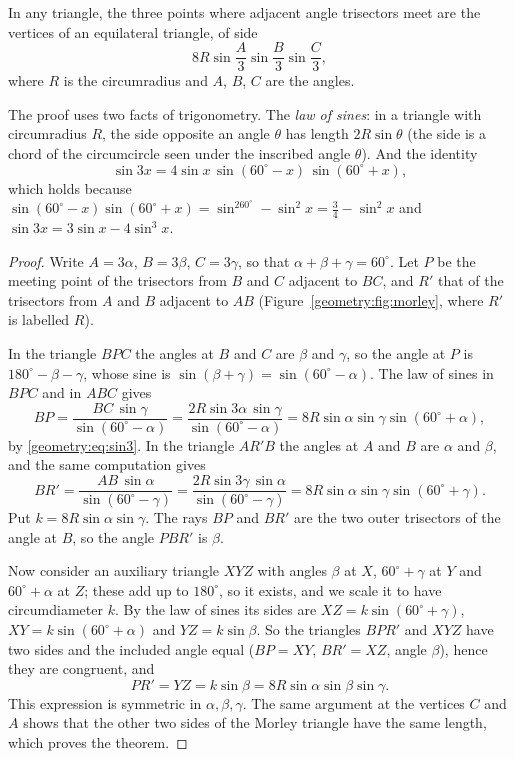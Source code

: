 \begin{theorem}[Morley, 1899]\label{geometry:thm:morley}
In any triangle, the three points where adjacent angle trisectors meet are the vertices of an equilateral triangle, of side
\[
8R\sin\frac A3\sin\frac B3\sin\frac C3 ,
\]
where $R$ is the circumradius and $A$, $B$, $C$ are the angles.
\end{theorem}

The proof uses two facts of trigonometry. The \emph{law of sines}: in a triangle with circumradius $R$, the side opposite an angle
$\theta$ has length $2R\sin\theta$ (the side is a chord of the circumcircle seen under the inscribed angle $\theta$). And the identity
\begin{equation}\label{geometry:eq:sin3}
\sin3x=4\sin x\,\sin(60^\circ-x)\,\sin(60^\circ+x),
\end{equation}
which holds because $\sin(60^\circ-x)\sin(60^\circ+x)=\sin^260^\circ-\sin^2x=\frac34-\sin^2x$ and $\sin3x=3\sin x-4\sin^3x$.

\begin{proof}
Write $A=3\alpha$, $B=3\beta$, $C=3\gamma$, so that $\alpha+\beta+\gamma=60^\circ$. Let $P$ be the meeting point of the trisectors from $B$ and
$C$ adjacent to $BC$, and $R'$ that of the trisectors from $A$ and $B$ adjacent to $AB$ (Figure~\ref{geometry:fig:morley}, where $R'$ is labelled
$R$).

In the triangle $BPC$ the angles at $B$ and $C$ are $\beta$ and $\gamma$, so the angle at $P$ is $180^\circ-\beta-\gamma$, whose sine is
$\sin(\beta+\gamma)=\sin(60^\circ-\alpha)$. The law of sines in $BPC$ and in $ABC$ gives
\[
BP=\frac{BC\,\sin\gamma}{\sin(60^\circ-\alpha)}=\frac{2R\sin3\alpha\,\sin\gamma}{\sin(60^\circ-\alpha)}=8R\sin\alpha\sin\gamma\sin(60^\circ+\alpha),
\]
by \eqref{geometry:eq:sin3}. In the triangle $AR'B$ the angles at $A$ and $B$ are $\alpha$ and $\beta$, and the same computation gives
\[
BR'=\frac{AB\,\sin\alpha}{\sin(60^\circ-\gamma)}=\frac{2R\sin3\gamma\,\sin\alpha}{\sin(60^\circ-\gamma)}=8R\sin\alpha\sin\gamma\sin(60^\circ+\gamma).
\]
Put $k=8R\sin\alpha\sin\gamma$. The rays $BP$ and $BR'$ are the two outer trisectors of the angle at $B$, so the angle $PBR'$ is $\beta$.

Now consider an auxiliary triangle $XYZ$ with angles $\beta$ at $X$, $60^\circ+\gamma$ at $Y$ and $60^\circ+\alpha$ at $Z$; these add up
to $180^\circ$, so it exists, and we scale it to have circumdiameter $k$. By the law of sines its sides are $XZ=k\sin(60^\circ+\gamma)$,
$XY=k\sin(60^\circ+\alpha)$ and $YZ=k\sin\beta$. So the triangles $BPR'$ and $XYZ$ have two sides and the included angle equal
($BP=XY$, $BR'=XZ$, angle $\beta$), hence they are congruent, and
\[
PR'=YZ=k\sin\beta=8R\sin\alpha\sin\beta\sin\gamma .
\]
This expression is symmetric in $\alpha,\beta,\gamma$. The same argument at the vertices $C$ and $A$ shows that the other two sides of the
Morley triangle have the same length, which proves the theorem.
\end{proof}

